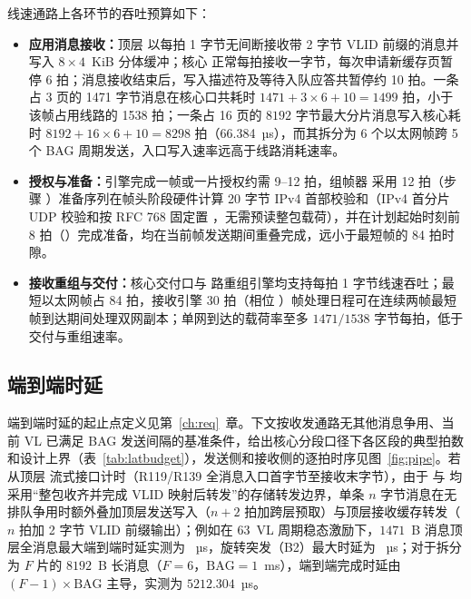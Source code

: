 线速通路上各环节的吞吐预算如下：
\begin{itemize}
  \item \textbf{应用消息接收：}顶层  以每拍 1 字节无间断接收带 2 字节 VLID 前缀的消息并写入 $8\times 4$~KiB 分体缓冲；核心  正常每拍接收一字节，每次申请新缓存页暂停 6 拍；消息接收结束后，写入描述符及等待入队应答共暂停约 10 拍。一条占 3 页的 1471 字节消息在核心口共耗时 $1471 + 3\times 6 + 10 = 1499$ 拍，小于该帧占用线路的 1538 拍；一条占 16 页的 $8192$ 字节最大分片消息写入核心耗时 $8192 + 16\times 6 + 10 = 8298$ 拍（66.384~µs），而其拆分为 6 个以太网帧跨 5 个 BAG 周期发送，入口写入速率远高于线路消耗速率。
  \item \textbf{授权与准备：}引擎完成一帧或一片授权约需 9--12 拍，组帧器  采用 12 拍（步骤 ）准备序列在帧头阶段硬件计算 20 字节 IPv4 首部校验和（IPv4 首分片 UDP 校验和按 RFC 768 固定置 ，无需预读整包载荷），并在计划起始时刻前 8 拍（）完成准备，均在当前帧发送期间重叠完成，远小于最短帧的 84 拍时隙。
  \item \textbf{接收重组与交付：}核心交付口与 \ReasmContexts{} 路重组引擎均支持每拍 1 字节线速吞吐；最短以太网帧占 84 拍，接收引擎 30 拍（相位 ）帧处理日程可在连续两帧最短帧到达期间处理双网副本；单网到达的载荷率至多 $1471/1538$ 字节每拍，低于交付与重组速率。
\end{itemize}

\subsection{端到端时延}

端到端时延的起止点定义见第~\ref{ch:req}~章。下文按收发通路无其他消息争用、当前 VL 已满足 BAG 发送间隔的基准条件，给出核心分段口径下各区段的典型拍数和设计上界（表~\ref{tab:latbudget}），发送侧和接收侧的逐拍时序见图~\ref{fig:pipe}。若从顶层  流式接口计时（R119/R139 全消息入口首字节至接收末字节），由于  与  均采用“整包收齐并完成 VLID 映射后转发”的存储转发边界，单条 $n$ 字节消息在无排队争用时额外叠加顶层发送写入（$n+2$ 拍加跨层预取）与顶层接收缓存转发（$n$ 拍加 2 字节 VLID 前缀输出）；例如在 63~VL 周期稳态激励下，$1471$~B 消息顶层全消息最大端到端时延实测为 \LatSixtyThreePMax~µs，旋转突发（B2）最大时延为 \LatSixtyThreeBTwo~µs；对于拆分为 $F$ 片的 $8192$~B 长消息（$F=6$，$\text{BAG}=1$~ms），端到端完成时延由 $(F-1)\times\text{BAG}$ 主导，实测为 $5212.304$~µs。

